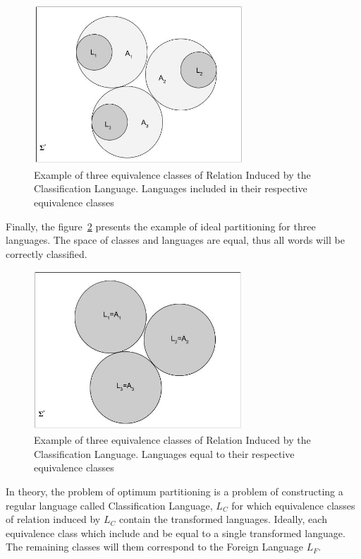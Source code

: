 \documentclass{mini}
\begin{document}
\begin{figure}[H]
    \centering
    \includegraphics[width=0.7\textwidth]{./images/equivalence_classes.jpg}
    \caption{Example of three equivalence classes of Relation Induced by the Classification Language. Languages included in their respective equivalence classes}
    \label{fig:eq_classes}
\end{figure}

Finally, the figure~\ref{fig:eq_classes_ideal} presents the example of ideal partitioning for three languages. The space of classes and languages are equal, thus all words will be correctly classified.

\begin{figure}[H]
    \centering
    \includegraphics[width=0.7\textwidth]{./images/equivalence_classes_ideal.jpg}
    \caption{Example of three equivalence classes of Relation Induced by the Classification Language. Languages equal to their respective equivalence classes}
    \label{fig:eq_classes_ideal}
\end{figure}

In theory, the problem of optimum partitioning is a problem of constructing a regular language called Classification Language, $L_{C}$ for which equivalence classes of relation induced by $L_{C}$ contain the transformed languages. Ideally, each equivalence class which include and be equal to a single transformed language. The remaining classes will them correspond to the Foreign Language $L_{F}$. 
\end{document}
